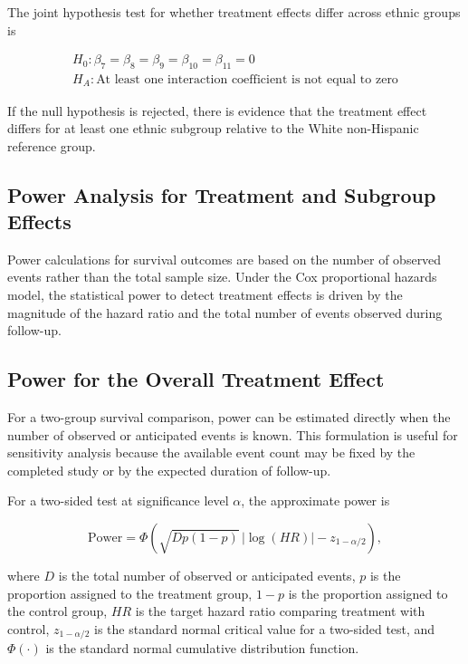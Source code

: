 \documentclass[
  letterpaper,
  DIV=11,
  numbers=noendperiod]{scrartcl}
\begin{document}
The joint hypothesis test for whether treatment effects differ across
ethnic groups is

\[
\begin{gathered}
H_0 : \beta_7 = \beta_8 = \beta_9 = \beta_{10} = \beta_{11} = 0 \\
H_A : \text{At least one interaction coefficient is not equal to zero}
\end{gathered}
\]

If the null hypothesis is rejected, there is evidence that the treatment
effect differs for at least one ethnic subgroup relative to the White
non-Hispanic reference group.

\subsection{Power Analysis for Treatment and Subgroup
Effects}\label{power-analysis-for-treatment-and-subgroup-effects}

Power calculations for survival outcomes are based on the number of
observed events rather than the total sample size. Under the Cox
proportional hazards model, the statistical power to detect treatment
effects is driven by the magnitude of the hazard ratio and the total
number of events observed during follow-up.

\subsection{Power for the Overall Treatment
Effect}\label{power-for-the-overall-treatment-effect}

For a two-group survival comparison, power can be estimated directly
when the number of observed or anticipated events is known. This
formulation is useful for sensitivity analysis because the available
event count may be fixed by the completed study or by the expected
duration of follow-up.

For a two-sided test at significance level \(\alpha\), the approximate
power is

\[
\text{Power}
=
\Phi\left(
\sqrt{D p(1-p)}\,|\log(HR)|
-
z_{1-\alpha/2}
\right),
\]

where \(D\) is the total number of observed or anticipated events, \(p\)
is the proportion assigned to the treatment group, \(1-p\) is the
proportion assigned to the control group, \(HR\) is the target hazard
ratio comparing treatment with control, \(z_{1-\alpha/2}\) is the
standard normal critical value for a two-sided test, and \(\Phi(\cdot)\)
is the standard normal cumulative distribution function.
\end{document}
